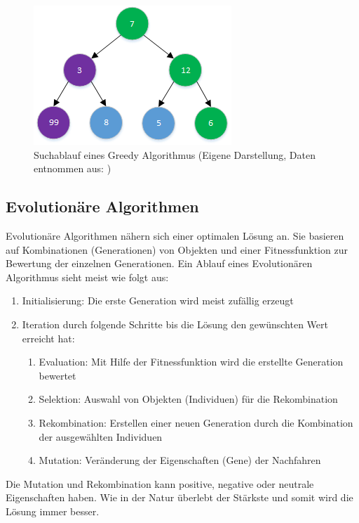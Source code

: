 \begin{figure}[h]
\centering 
\includegraphics[scale=1]{images/einleitung/greedy_algo.png}
\caption[Suchablauf eines Greedy Algorithmus]{Suchablauf eines Greedy Algorithmus (Eigene Darstellung, Daten entnommen aus: \cite{pic_greedy_algo})}
\label{fig:greedy_algo}
\end{figure}

\FloatBarrier

\subsection{Evolutionäre Algorithmen}\label{ea_algos}
Evolutionäre Algorithmen nähern sich einer optimalen Lösung an. Sie basieren auf Kombinationen (Generationen) von Objekten und einer Fitnessfunktion zur Bewertung der einzelnen Generationen. 
Ein Ablauf eines Evolutionären Algorithmus sieht meist wie folgt aus:
\begin{enumerate}
	\item Initialisierung: Die erste Generation wird meist zufällig erzeugt
	\item Iteration durch folgende Schritte bis die Lösung den gewünschten Wert erreicht hat:
     	\begin{enumerate}
		\item Evaluation: Mit Hilfe der Fitnessfunktion wird die erstellte Generation bewertet
         		\item Selektion: Auswahl von Objekten (Individuen) für die Rekombination
         		\item Rekombination: Erstellen einer neuen Generation durch die Kombination der ausgewählten Individuen
         		\item Mutation: Veränderung der Eigenschaften (Gene) der Nachfahren
      	\end{enumerate}
\end{enumerate}
Die Mutation und Rekombination kann positive, negative oder neutrale Eigenschaften haben. Wie in der Natur überlebt der Stärkste und somit wird die Lösung immer besser.
